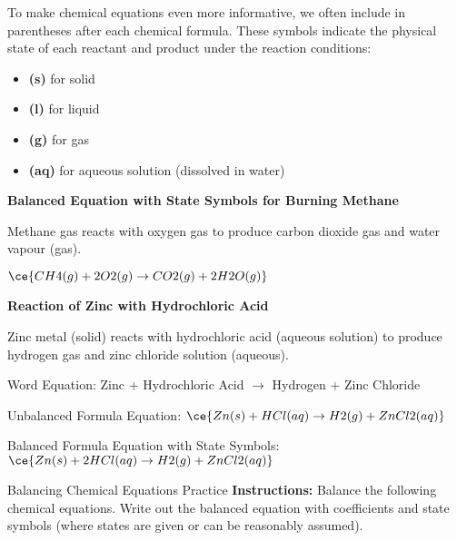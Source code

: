 {To make chemical equations even more informative, we often include  in parentheses after each chemical formula. These symbols indicate the physical state of each reactant and product under the reaction conditions:

\begin{itemize}
    \item \textbf{(s)} for solid
    \item \textbf{(l)} for liquid
    \item \textbf{(g)} for gas
    \item \textbf{(aq)} for aqueous solution (dissolved in water)
\end{itemize}

\begin{example}
\textbf{Balanced Equation with State Symbols for Burning Methane}

Methane gas reacts with oxygen gas to produce carbon dioxide gas and water vapour (gas).

\texttt{$\ce{CH4(g) + 2O2(g) \rightarrow CO2(g) + 2H2O(g)}$}
\end{example}

\begin{example}
\textbf{Reaction of Zinc with Hydrochloric Acid}

Zinc metal (solid) reacts with hydrochloric acid (aqueous solution) to produce hydrogen gas and zinc chloride solution (aqueous).

Word Equation: Zinc + Hydrochloric Acid $\rightarrow$ Hydrogen + Zinc Chloride

Unbalanced Formula Equation: $\ce{Zn(s) + HCl(aq) \rightarrow H2(g) + ZnCl2(aq)}$

Balanced Formula Equation with State Symbols: $\ce{Zn(s) + 2HCl(aq) \rightarrow H2(g) + ZnCl2(aq)}$
\end{example}

\begin{investigation}{Balancing Chemical Equations Practice}
\textbf{Instructions:}
Balance the following chemical equations. Write out the balanced equation with coefficients and state symbols (where states are given or can be reasonably assumed).


\end{investigation}}
